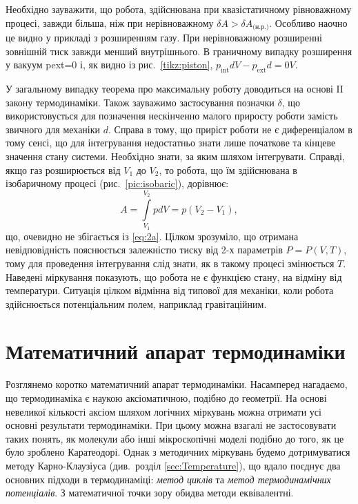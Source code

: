 Необхідно зауважити, що робота, здійснювана при квазістатичному рівноважному процесі, завжди
більша, ніж
при нерівноважному $\delta A > \delta A_{\text{(н.р.)}}$. Особливо наочно це видно у прикладі з
розширенням газу. При нерівноважному розширенні зовнішній тиск завжди менший внутрішнього. В
граничному випадку розширення у вакуум pext=0 і, як видно із рис.~\ref{tikz:piston},
$p_\text{int} dV - p_\text{ext}d = 0V$.

У загальному випадку теорема про максимальну роботу доводиться на основі ΙΙ закону термодинаміки.
Також зауважимо застосування позначки $\delta$, що використовується для позначення нескінченно малого
приросту роботи замість звичного для механіки $d$. Справа в тому, що приріст роботи не є
диференціалом
в тому сенсі, що для інтегрування недостатньо знати лише початкове та кінцеве значення стану системи.
Необхідно знати, за яким шляхом інтегрувати. Справді, якщо газ розширюється від $V_1$ до $V_2$, то
робота, що їм здійснювана в ізобаричному процесі (рис.~\ref{pic:isobaric}), дорівнює:
\begin{equation}\label{eq:IcobaricWork}
	A = \int\limits_{V_1}^{V_2} p dV = p(V_2 - V_1),
\end{equation}
що, очевидно не збігається із \eqref{eq:2a}. Цілком зрозуміло, що отримана невідповідність
пояснюється залежністю тиску від 2-х параметрів $P=P(V,T)$, тому для проведення інтегрування слід
знати, як в такому процесі змінюється $T$. Наведені міркування показують, що робота не є функцією
стану, на відміну від температури. Ситуація цілком відмінна від типової для механіки, коли робота
здійснюється  потенціальним полем, наприклад гравітаційним.

\section{Математичний апарат термодинаміки}

Розглянемо коротко математичний апарат термодинаміки. Насамперед нагадаємо, що термодинаміка є наукою
аксіоматичною, подібно до геометрії. На основі невеликої кількості аксіом шляхом логічних
міркувань
можна отримати усі основні результати термодинаміки. При цьому можна взагалі не застосовувати таких
понять, як молекули або інші мікроскопічні моделі подібно до того, як це було зроблено
Каратеодорі.
Однак з методичних міркувань будемо дотримуватися методу Карно-Клаузіуса (див.~розділ
\ref{sec:Temperature}), що вдало поєднує два основних підходи в термодинаміці: \emph{метод циклів} та
\emph{метод термодинамічних потенціалів}. З математичної точки зору обидва методи еквівалентні.

